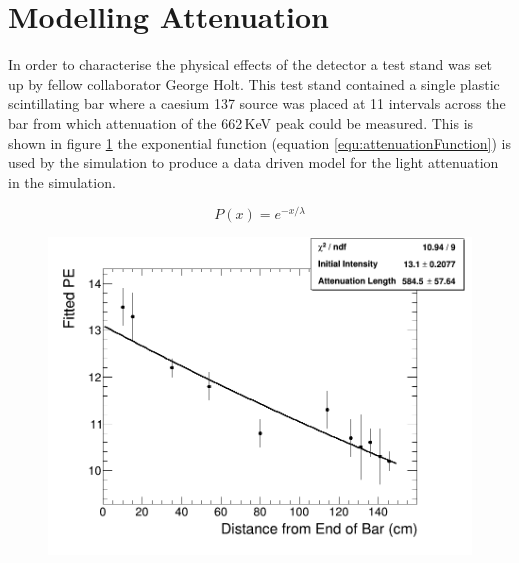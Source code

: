 \section{Modelling Attenuation}\label{sec:geant4Simulation_ModellingAttenuation}
In order to characterise the physical effects of the detector a test stand was set up by fellow collaborator George Holt. This test stand contained a single plastic scintillating bar where a caesium 137 source was placed at 11 intervals across the bar from which attenuation of the 662\,KeV peak could be measured. This is shown in figure \ref{fig:attenuationPlot} the exponential function (equation \ref{equ:attenuationFunction}) is used by the simulation to produce a data driven model for the light attenuation in the simulation. 

\begin{equation}
P(x) = e^{-x/\lambda}
\label{equ:attenuationFunction}
\end{equation}

\begin{figure}[htbp]
 \centering
 \includegraphics[width=1.0\linewidth]{result_from_attnPlotter.png} 
 \label{fig:attenuationPlot}
\end{figure}

